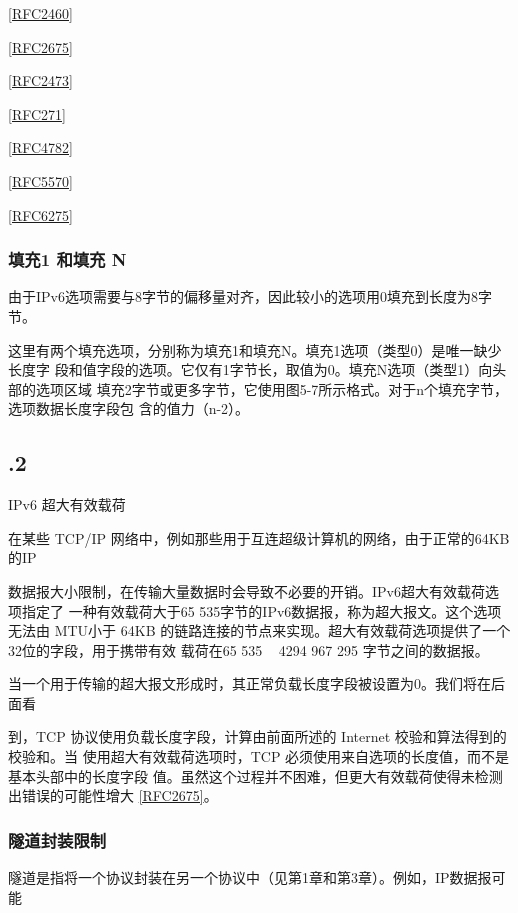 \href{https://www.rfc-editor.org/rfc/rfc2460}{[RFC2460]}

\href{https://www.rfc-editor.org/rfc/rfc2675}{[RFC2675]}

\href{https://www.rfc-editor.org/rfc/rfc2473}{[RFC2473]}

\href{https://www.rfc-editor.org/rfc/rfc271}{[RFC271]}

\href{https://www.rfc-editor.org/rfc/rfc4782}{[RFC4782]}

\href{https://www.rfc-editor.org/rfc/rfc5570}{[RFC5570]}

\href{https://www.rfc-editor.org/rfc/rfc6275}{[RFC6275]}

\subsubsection{填充1 和填充 N}
由于IPv6选项需要与8字节的偏移量对齐，因此较小的选项用0填充到长度为8字节。

这里有两个填充选项，分别称为填充1和填充N。填充1选项（类型0）是唯一缺少长度字
段和值字段的选项。它仅有1字节长，取值为0。填充N选项（类型1）向头部的选项区域
填充2字节或更多字节，它使用图5-7所示格式。对于n个填充字节，选项数据长度字段包
含的值力（n-2）。

\subsection{.2}
IPv6 超大有效载荷

在某些 TCP/IP 网络中，例如那些用于互连超级计算机的网络，由于正常的64KB 的IP

数据报大小限制，在传输大量数据时会导致不必要的开销。IPv6超大有效载荷选项指定了
一种有效载荷大于65 535字节的IPv6数据报，称为超大报文。这个选项无法由 MTU小于
64KB 的链路连接的节点来实现。超大有效载荷选项提供了一个32位的字段，用于携带有效
载荷在65 535 ~ 4294 967 295 字节之间的数据报。

当一个用于传输的超大报文形成时，其正常负载长度字段被设置为0。我们将在后面看

到，TCP 协议使用负载长度字段，计算由前面所述的 Internet 校验和算法得到的校验和。当
使用超大有效载荷选项时，TCP 必须使用来自选项的长度值，而不是基本头部中的长度字段
值。虽然这个过程并不困难，但更大有效载荷使得未检测出错误的可能性增大 \href{https://www.rfc-editor.org/rfc/rfc2675}{[RFC2675]}。

\subsubsection{隧道封装限制}
隧道是指将一个协议封装在另一个协议中（见第1章和第3章）。例如，IP数据报可能

